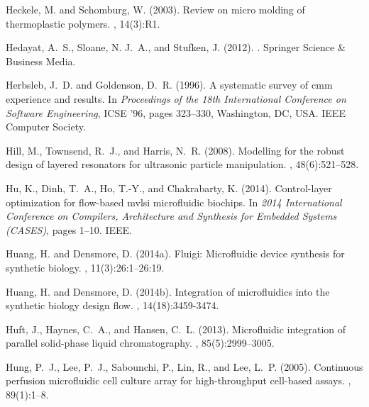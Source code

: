 \documentclass[12pt,letterpaper]{report}          %
\begin{document}
\begin{thebibliography}{}
Heckele, M. and Schomburg, W. (2003).
\newblock Review on micro molding of thermoplastic polymers.
, 14(3):R1.

Hedayat, A.~S., Sloane, N. J.~A., and Stufken, J. (2012).
.
\newblock Springer Science \& Business Media.

Herbsleb, J.~D. and Goldenson, D.~R. (1996).
\newblock A systematic survey of cmm experience and results.
\newblock In {\em Proceedings of the 18th International Conference on Software
  Engineering}, ICSE '96, pages 323--330, Washington, DC, USA. IEEE Computer
  Society.

Hill, M., Townsend, R.~J., and Harris, N.~R. (2008).
\newblock Modelling for the robust design of layered resonators for ultrasonic
  particle manipulation.
, 48(6):521--528.

Hu, K., Dinh, T.~A., Ho, T.-Y., and Chakrabarty, K. (2014).
\newblock Control-layer optimization for flow-based mvlsi microfluidic
  biochips.
\newblock In {\em 2014 International Conference on Compilers, Architecture and Synthesis for Embedded Systems (CASES)}, pages 1--10. IEEE.

Huang, H. and Densmore, D. (2014a).
\newblock Fluigi: Microfluidic device synthesis for synthetic biology.
, 11(3):26:1--26:19.

Huang, H. and Densmore, D. (2014b).
\newblock Integration of microfluidics into the synthetic biology design flow.
, 14(18):3459-3474.


Huft, J., Haynes, C.~A., and Hansen, C.~L. (2013).
\newblock Microfluidic integration of parallel solid-phase liquid
  chromatography.
, 85(5):2999--3005.

Hung, P.~J., Lee, P.~J., Sabounchi, P., Lin, R., and Lee, L.~P. (2005).
\newblock Continuous perfusion microfluidic cell culture array for
  high-throughput cell-based assays.
, 89(1):1--8.


\end{thebibliography}
\end{document}
